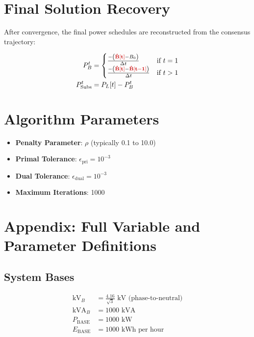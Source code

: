 \documentclass[11pt]{article}
\newcommand{\redBhat}[1]{\textcolor{redvar}{\mathbf{#1}}}     %
\begin{document}
\section{Final Solution Recovery}

After convergence, the final power schedules are reconstructed from the consensus trajectory:

\begin{align}
P_{B}^{t} &= 
\begin{cases}
\frac{-\left(\redBhat{\hat{B}[t]} - B_0\right)}{\Delta t} & \text{if } t = 1 \\
\frac{-\left(\redBhat{\hat{B}[t]} - \redBhat{\hat{B}[t-1]}\right)}{\Delta t} & \text{if } t > 1
\end{cases} \\
P_{\text{Subs}}^{t} &= P_L[t] - P_{B}^{t}
\end{align}

\section{Algorithm Parameters}

\begin{itemize}
    \item \textbf{Penalty Parameter}: $\rho$ (typically 0.1 to 10.0)
    \item \textbf{Primal Tolerance}: $\epsilon_{\text{pri}} = 10^{-3}$
    \item \textbf{Dual Tolerance}: $\epsilon_{\text{dual}} = 10^{-3}$
    \item \textbf{Maximum Iterations}: 1000
\end{itemize}

\section{Appendix: Full Variable and Parameter Definitions}

\subsection{System Bases}
\begin{align}
\text{kV}_B &= \frac{4.16}{\sqrt{3}} \text{ kV (phase-to-neutral)} \\
\text{kVA}_B &= 1000 \text{ kVA} \\
P_{\text{BASE}} &= 1000 \text{ kW} \\
E_{\text{BASE}} &= 1000 \text{ kWh per hour}
\end{align}
\end{document}
